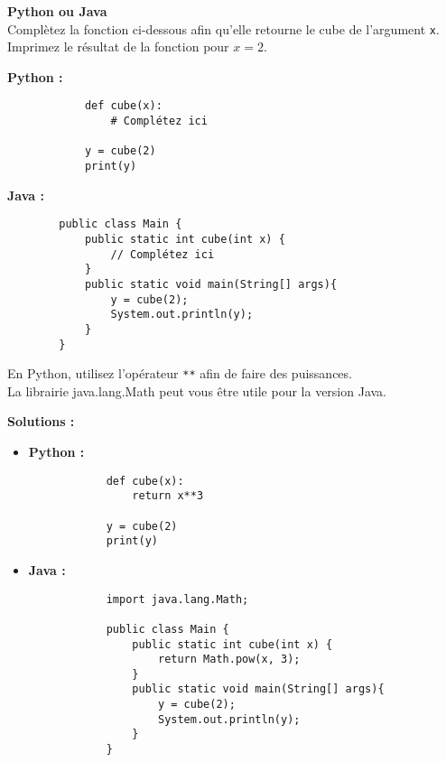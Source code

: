 \begin{Exercice}[5 minutes] \textbf{Python ou Java} \\
    Complètez la fonction ci-dessous afin qu'elle retourne le cube de l'argument \lstinline{x}. Imprimez le résultat de la fonction pour $x = 2$.
    
    \textbf{Python :}
        \begin{verbatim}
            def cube(x):
                # Complétez ici
                
            y = cube(2)
            print(y)
        \end{verbatim}
        
    \textbf{Java :}
    \begin{verbatim}
        public class Main {
            public static int cube(int x) {
                // Complétez ici
            }
            public static void main(String[] args){
                y = cube(2);
                System.out.println(y);
            }
        }
    \end{verbatim}
    
    
    
    \begin{conseil}
        En Python, utilisez l'opérateur \lstinline{**} afin de faire des puissances. \\ 
        La librairie java.lang.Math peut vous être utile pour la version Java.
    \end{conseil}
    \textbf{Solutions :}
    \begin{itemize}
        \item \textbf{Python :}
        \begin{verbatim}
            def cube(x):
                return x**3
                
            y = cube(2)
            print(y)
        \end{verbatim}
        
        \item \textbf{Java :}
        \begin{verbatim}
            import java.lang.Math;
            
            public class Main {
                public static int cube(int x) {
                    return Math.pow(x, 3);
                }
                public static void main(String[] args){
                    y = cube(2);
                    System.out.println(y);
                }
            }
        \end{verbatim}
    \end{itemize}

\end{Exercice}

